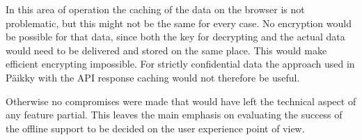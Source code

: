 In this area of operation the caching of the data on the browser is not problematic, but this might not be the same for every case. No encryption would be possible for that data, since both the key for decrypting and the actual data would need to be delivered and stored on the same place. This would make efficient encrypting impossible. For strictly confidential data the approach used in Päikky with the API response caching would not therefore be useful. %

Otherwise no compromises were made that would have left the technical aspect of any feature partial. This leaves the main emphasis on evaluating the success of the offline support to be decided on the user experience point of view.



 

